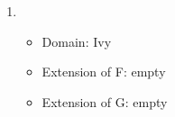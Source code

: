 \begin{enumerate}
\begin{enumerate}
	\item {}

	 \opts{

	  \dotline
	  \dotline
	  \dotline
	  \dotline
	  \dotline

	 }
	 {

	  \begin{itemize}

	   \item Domain: Ivy

	  \item Extension of F: empty

	 \item Extension of G: empty

   \end{itemize}
  }



 \end{enumerate}


\end{enumerate}







